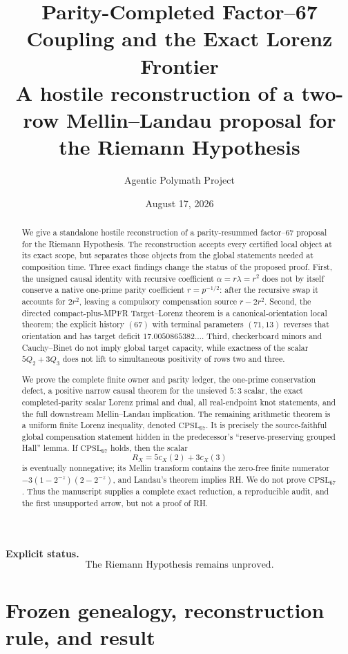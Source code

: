 \documentclass[11pt]{article}
\title{Parity-Completed Factor--67 Coupling and the Exact Lorenz Frontier\\
\large A hostile reconstruction of a two-row Mellin--Landau proposal for the Riemann Hypothesis}
\author{Agentic Polymath Project}
\date{August 17, 2026}
\newcommand{\CPSL}{\mathrm{CPSL}_{67}}
\newcommand{\1}{\mathbf 1}
\begin{document}
\maketitle

\begin{abstract}
We give a standalone hostile reconstruction of a parity-resummed factor--67 proposal for the Riemann Hypothesis.  The reconstruction accepts every certified local object at its exact scope, but separates those objects from the global statements needed at composition time.  Three exact findings change the status of the proposed proof.  First, the unsigned causal identity with recursive coefficient $\alpha=r\lambda=r^2$ does not by itself conserve a native one-prime parity coefficient $r=p^{-1/2}$: after the recursive swap it accounts for $2r^2$, leaving a compulsory compensation source $r-2r^2$.  Second, the directed compact-plus-MPFR Target--Lorenz theorem is a canonical-orientation local theorem; the explicit history $(67)$ with terminal parameters $(71,13)$ reverses that orientation and has target deficit $17.0050865382\ldots$.  Third, checkerboard minors and Cauchy--Binet do not imply global target capacity, while exactness of the scalar $5Q_2+3Q_3$ does not lift to simultaneous positivity of rows two and three.

We prove the complete finite owner and parity ledger, the one-prime conservation defect, a positive narrow causal theorem for the unsieved $5{:}3$ scalar, the exact completed-parity scalar Lorenz primal and dual, all real-endpoint knot statements, and the full downstream Mellin--Landau implication.  The remaining arithmetic theorem is a uniform finite Lorenz inequality, denoted $\CPSL$.  It is precisely the source-faithful global compensation statement hidden in the predecessor's ``reserve-preserving grouped Hall'' lemma.  If $\CPSL$ holds, then the scalar
\[
R_X=5c_X(2)+3c_X(3)
\]
is eventually nonnegative; its Mellin transform contains the zero-free finite numerator $-3(1-2^{-z})(2-2^{-z})$, and Landau's theorem implies RH.  We do not prove $\CPSL$.  Thus the manuscript supplies a complete exact reduction, a reproducible audit, and the first unsupported arrow, but not a proof of RH.
\end{abstract}

\noindent\textbf{Explicit status.}
\[
\boxed{\text{The Riemann Hypothesis remains unproved.}}
\]

\tableofcontents

\section{Frozen genealogy, reconstruction rule, and result}
\end{document}
